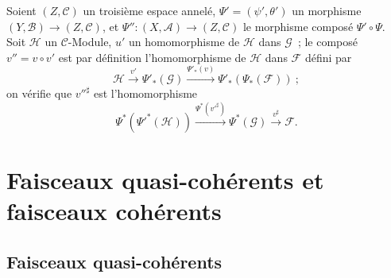 \begin{env}[4.4.8]
\label{0.4.4.8-fr}
Soient $(Z,\mathcal{C})$ un troisième espace annelé,
$\Psi'=(\psi',\theta')$ un morphisme $(Y,\mathcal{B})\to(Z,\mathcal{C})$, et
$\Psi'':(X,\mathcal{A})\to(Z,\mathcal{C})$ le morphisme composé
$\Psi'\circ\Psi$. Soit $\mathcal{H}$ un $\mathcal{C}$-Module, $u'$ un
homomorphisme de $\mathcal{H}$ dans $\mathcal{G}$~; le composé
$v''=v\circ v'$ est par définition l'homomorphisme de $\mathcal{H}$ dans
$\mathcal{F}$ défini par
\[
  \mathcal{H}\xrightarrow{v'}\Psi'_*(\mathcal{G})
  \xrightarrow{\Psi'_*(v)}\Psi'_*(\Psi_*(\mathcal{F}))~;
\]
on vérifie que ${v''}^\sharp$ est l'homomorphisme
\[
  \Psi^*({\Psi'}^*(\mathcal{H}))
  \xrightarrow{\Psi^*({v'}^\sharp)}
  \Psi^*(\mathcal{G})
  \xrightarrow{v^\sharp}\mathcal{F}.
\]
\end{env}

\section{Faisceaux quasi-cohérents et faisceaux cohérents}
\label{section:0.5-fr}

\subsection{Faisceaux quasi-cohérents}
\label{subsection:0.5.1-fr}

